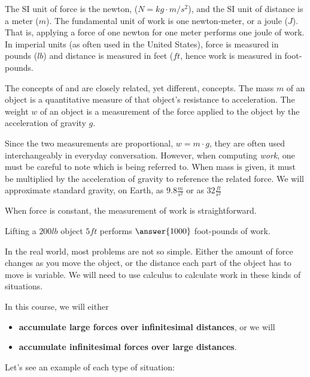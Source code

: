 \documentclass{ximera}
\begin{document}
The SI unit of force is the newton, ($\unit{N} = \unit{kg}\cdot
\unit{m}/\unit{s}^2$), and the SI unit of distance is a meter
($\unit{m}$). The fundamental unit of work is one newton-meter, or a
joule ($\unit{J}$). That is, applying a force of one newton for one
meter performs one joule of work. In imperial units (as often used in
the United States), force is measured in pounds ($\unit{lb}$) and distance is
measured in feet ($\unit{ft}$, hence work is measured in foot-pounds.

\begin{warning} The concepts of  and  are
  closely related, yet different, concepts. The mass $m$ of an object
  is a quantitative measure of that object's resistance to
  acceleration. The weight $w$ of an object is a measurement of the
  force applied to the object by the acceleration of gravity $g$.

  Since the two measurements are proportional, $w=m\cdot g$, they are
  often used interchangeably in everyday conversation. However, when
  computing \textit{work}, one must be careful to note which is being
  referred to. When mass is given, it must be multiplied by the
  acceleration of gravity to reference the related force.  We will
  approximate standard gravity, on Earth, as
  $9.8\frac{\unit{m}}{\unit{s}^2}$ or as $32
  \frac{\unit{ft}}{\unit{s}^2}$
\end{warning}

When force is constant, the measurement of work is straightforward.

\begin{question}
Lifting a $200\unit{lb}$ object $5 \unit{ft}$ performs $\answer{1000}$
foot-pounds of work.
\end{question}

In the real world, most problems are not so simple.  Either the amount
of force changes as you move the object, or the distance each part of
the object has to move is variable.  We will need to use calculus to
calculate work in these kinds of situations.

In this course, we will either
\begin{itemize}
  \item \textbf{accumulate large forces over infinitesimal distances}, or we
    will
  \item \textbf{accumulate infinitesimal forces over large distances}.
\end{itemize}
Let's see an example of each type of situation:
\end{document}
